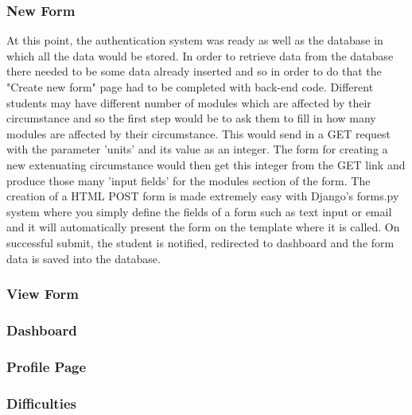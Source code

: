 \documentclass[../main.tex]{subfiles}
\begin{document}
\subsubsection{New Form}
At this point, the authentication system was ready as well as the database in which all the data would be stored. In order to retrieve data from the database there needed to be some data already inserted and so in order to do that the "Create new form" page had to be completed with back-end code. Different students may have different number of modules which are affected by their circumstance and so the first step would be to ask them to fill in how many modules are affected by their circumstance. This would send in a GET request with the parameter 'units' and its value as an integer. The form for creating a new extenuating circumstance would then get this integer from the GET link and produce those many 'input fields' for the modules section of the form. The creation of a HTML POST form is made extremely easy with Django's forms.py system where you simply define the fields of a form such as text input or email and it will automatically present the form on the template where it is called. On successful submit, the student is notified, redirected to dashboard and the form data is saved into the database.

\subsubsection{View Form} 
\subsubsection{Dashboard} 
\subsubsection{Profile Page} 
\subsubsection{Difficulties}
\end{document}
